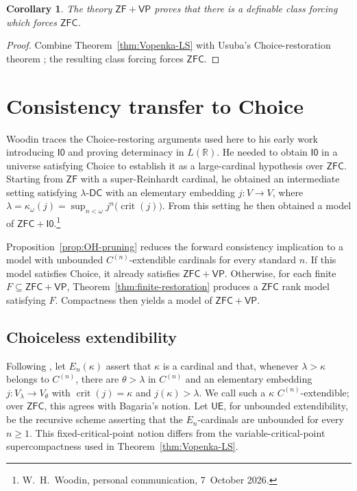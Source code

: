 \documentclass[11pt,a4paper]{amsart}
\DeclareRobustCommand{\revision}[1]{#1}
\newcommand{\VP}{\mathsf{VP}}
\newcommand{\ZF}{\mathsf{ZF}}
\newcommand{\ZFC}{\mathsf{ZFC}}
\newcommand{\DC}{\mathsf{DC}}
\newcommand{\crit}{\operatorname{crit}}
\newcommand{\UE}{\mathsf{UE}}
\newcommand{\Izero}{\mathsf{I0}}
\theoremstyle{plain}
\newtheorem{corollary}[theorem]{Corollary}
\theoremstyle{definition}
\theoremstyle{remark}
\begin{document}
\begin{corollary}\label{cor:class-force-ZFC}
The theory $\ZF+\VP$ proves that there is a definable class forcing which forces $\ZFC$.
\end{corollary}

\begin{proof}
Combine Theorem~\ref{thm:Vopenka-LS} with Usuba's Choice-restoration theorem \cite[Corollary~4.8]{Usuba}; the resulting class forcing forces $\ZFC$.
\end{proof}
\endgroup

\begingroup

\section{Consistency transfer to Choice}\label{sec:consistency-transfer}

\revision{Woodin traces the Choice-restoring arguments used here
to his early work introducing $\Izero$ and proving determinacy in
$L(\mathbb R)$. He needed to obtain $\Izero$ in a universe satisfying
Choice to establish it as a large-cardinal hypothesis over $\ZFC$.
Starting from $\ZF$ with a super-Reinhardt cardinal, he obtained
an intermediate setting
satisfying $\lambda$-$\DC$ with an elementary embedding $j:V\to V$,
where $\lambda=\kappa_\omega(j)
=\sup_{n<\omega}j^n\bigl(\crit(j)\bigr)$.
From this setting he then obtained a model of
$\ZFC+\Izero$.\footnote{%
\revision{W.~H.~Woodin, personal communication, 7~October 2026.}}}

Proposition~\ref{prop:OH-pruning} reduces the forward consistency implication to a model with unbounded $C^{(n)}$-extendible cardinals for every standard $n$.  If this model satisfies Choice, it already satisfies $\ZFC+\VP$.  Otherwise, for each finite $F\subseteq\ZFC+\VP$, Theorem~\ref{thm:finite-restoration} produces a $\ZFC$ rank model satisfying $F$.  Compactness then yields a model of $\ZFC+\VP$.

\subsection*{{Choiceless extendibility}}

Following \cite[Definition~6.6]{Mohammd}, let $E_n(\kappa)$ assert that $\kappa$ is a cardinal and that, whenever $\lambda>\kappa$ belongs to $C^{(n)}$, there are $\theta>\lambda$ in $C^{(n)}$ and an elementary embedding $j:V_\lambda\to V_\theta$ with $\crit(j)=\kappa$ and $j(\kappa)>\lambda$.  We call such a $\kappa$ $C^{(n)}$-extendible; over $\ZFC$, this agrees with Bagaria's notion.  Let $\UE$, for unbounded extendibility, be the recursive scheme asserting that the $E_n$-cardinals are unbounded for every $n\geq1$.
This fixed-critical-point notion differs from the variable-critical-point supercompactness used in Theorem~\ref{thm:Vopenka-LS}.
\end{document}
